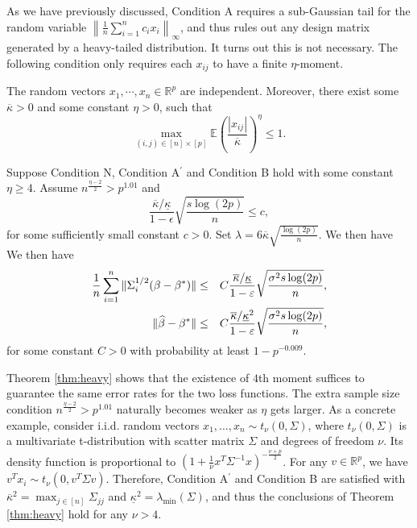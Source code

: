 As we have previously discussed, Condition A requires a sub-Gaussian tail for the random variable $\left\|\frac{1}{n}\sum_{i=1}^nc_ix_i\right\|_{\infty}$, and thus rules out any design matrix generated by a heavy-tailed distribution. It turns out this is not necessary. The following condition only requires each $x_{ij}$ to have a finite $\eta$-moment.

\begin{conda'}
The random vectors $x_1,\cdots,x_n\in\mathbb{R}^p$ are independent. Moreover, there exist some $\overline{\kappa}>0$ and some constant $\eta>0$, such that
$$\max_{(i,j)\in[n]\times [p]}\mathbb{E}\left(\frac{|x_{ij}|}{\overline{\kappa}}\right)^{\eta}\leq 1.$$
\end{conda'}

\begin{thm}\label{thm:heavy}
Suppose Condition N, Condition A${}^\prime$ and Condition B hold with some constant $\eta\geq 4$. Assume $n^{\frac{\eta-2}{2}}>p^{1.01}$ and
$$\frac{\overline{\kappa}/\underline{\kappa}}{1-\epsilon}\sqrt{\frac{s\log(2p)}{n}}\leq c,$$
for some sufficiently small constant $c>0$. Set $\lambda=6\overline{\kappa}\sqrt{\frac{\log(2p)}{n}}$. We then have
We then have
\begin{eqnarray*}
\frac{1}{n}\sum_{i=1}^n\|\Sigma_i^{1/2}(\beta-\beta^*)\| &\leq& C\frac{\overline{\kappa}/\underline{\kappa}}{1-\epsilon}\sqrt{\frac{\sigma^2s\log(2p)}{n}}, \\
\|\wh{\beta}-\beta^*\| &\leq& C\frac{\overline{\kappa}/\underline{\kappa}^2}{1-\epsilon}\sqrt{\frac{\sigma^2s\log(2p)}{n}},
\end{eqnarray*}
for some constant $C>0$ with probability at least $1-p^{-0.009}$.
\end{thm}

Theorem \ref{thm:heavy} shows that the existence of $4$th moment suffices to guarantee the same error rates for the two loss functions. The extra sample size condition $n^{\frac{\eta-2}{2}}>p^{1.01}$ naturally becomes weaker as $\eta$ gets larger. As a concrete example, consider i.i.d. random vectors $x_1,...,x_n\sim t_{\nu}(0,\Sigma)$, where $t_{\nu}(0,\Sigma)$ is a multivariate t-distribution with scatter matrix $\Sigma$ and degrees of freedom $\nu$. Its density function is proportional to $\left(1+\frac{1}{\nu}x^T\Sigma^{-1}x\right)^{-\frac{\nu+p}{2}}$. For any $v\in\mathbb{R}^p$, we have $v^Tx_i\sim t_{\nu}(0,v^T\Sigma v)$. Therefore, Condition A${}^\prime$ and Condition B are satisfied with $\overline{\kappa}^2=\max_{j\in[n]}\Sigma_{jj}$ and $\underline{\kappa}^2=\lambda_{\min}(\Sigma)$, and thus the conclusions of Theorem \ref{thm:heavy} hold for any $\nu>4$.

